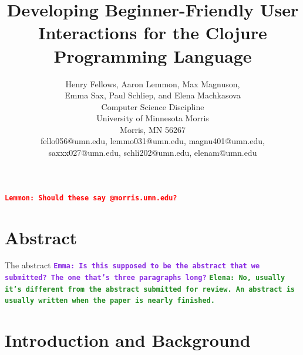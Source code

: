 \documentclass[12pt]{article}
\newcommand{\comment}[1]{{\bf \tt  {#1}}}
\newcommand{\emcomment}[1]{\textcolor{ForestGreen}{\comment{Elena: {#1}}}}
\newcommand{\escomment}[1]{\textcolor{BlueViolet}{\comment{Emma: {#1}}}}
\newcommand{\alcomment}[1]{\textcolor{red}{\comment{Lemmon: {#1}}}}
\begin{document}
\pagestyle{plain}
%

\title{Developing Beginner-Friendly User Interactions for the Clojure Programming Language}
%
%

\author{
Henry Fellows, Aaron Lemmon, Max Magnuson, \\
	Emma Sax, Paul Schliep, and Elena Machkasova \\
Computer Science Discipline \\
University of Minnesota Morris\\
Morris, MN 56267\\
fello056@umn.edu, lemmo031@umn.edu, magnu401@umn.edu, \\
	saxxx027@umn.edu, schli202@umn.edu, elenam@umn.edu
}
\date{}
\maketitle
\thispagestyle{empty}
\alcomment{Should these say @morris.umn.edu?}

\section*{\centering Abstract}
The abstract
\escomment{Is this supposed to be the abstract that we submitted? The
  one that's three paragraphs long?}
\emcomment{No, usually it's different from the abstract submitted for
  review. An abstract is usually written when the paper is nearly
  finished.}

\newpage
\setcounter{page}{1}

\section{Introduction and Background}\label{sec:intro}
\end{document}
